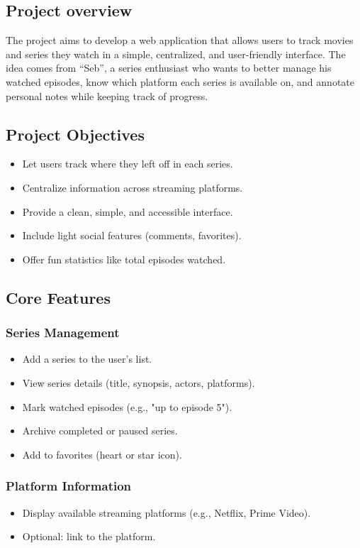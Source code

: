 \subsection{Project overview}
The project aims to develop a web application that allows users to track movies and series they watch in a simple, centralized, and user-friendly interface. The idea comes from “Seb”, a series enthusiast who wants to better manage his watched episodes, know which platform each series is available on, and annotate personal notes while keeping track of progress.

\subsection{Project Objectives}
\begin{itemize}
    \item Let users track where they left off in each series.
    \item Centralize information across streaming platforms.
    \item Provide a clean, simple, and accessible interface.
    \item Include light social features (comments, favorites).
    \item Offer fun statistics like total episodes watched.
\end{itemize}

\subsection{Core Features}

\subsubsection{Series Management}
\begin{itemize}
    \item Add a series to the user's list.
    \item View series details (title, synopsis, actors, platforms).
    \item Mark watched episodes (e.g., "up to episode 5").
    \item Archive completed or paused series.
    \item Add to favorites (heart or star icon).
\end{itemize}

\subsubsection{Platform Information}
\begin{itemize}
    \item Display available streaming platforms (e.g., Netflix, Prime Video).
    \item Optional: link to the platform.
\end{itemize}

